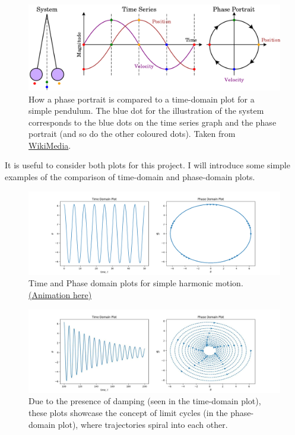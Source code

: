 \documentclass[10pt, twocolumn]{article}
\begin{document}
\begin{figure}[H]
    \centering  
    \includegraphics[width = \columnwidth]{Projects/ForcedSimplePendulum/WrittenReport/figs/Pendulum_phase_portrait_illustration.svg.png}
    \caption{How a phase portrait is compared to a time-domain plot for a simple pendulum. The blue dot for the illustration of the system corresponds to the blue dots on the time series graph and the phase portrait (and so do the other coloured dots). Taken from \href{https://commons.wikimedia.org/wiki/File:Pendulum_phase_portrait_illustration.svg}{WikiMedia}.}
    \label{fig:enter-label}
\end{figure}
 It is useful to consider both plots for this project. I will introduce some simple examples of the comparison of time-domain and phase-domain plots.
 \begin{figure}[H]
     \centering
     \includegraphics[width = \columnwidth]{Projects/ForcedSimplePendulum/Plots/demo_shm.png}
     \caption{Time and Phase domain plots for simple harmonic motion. \href{https://github.com/linsuong/PHYS-6017-Labs/blob/main/Projects/ForcedSimplePendulum/Plots/demo_shm.gif}{(Animation here)}}
     \label{fig:enter-label}
 \end{figure}

 \begin{figure}[H]
     \centering
     \includegraphics[width = \columnwidth]{Projects/ForcedSimplePendulum/Plots/demo_limit_cycles.jpg}
     \caption{Due to the presence of damping (seen in the time-domain plot), these plots showcase the concept of limit cycles (in the phase-domain plot), where trajectories spiral into each other.}
     \label{fig:enter-label}
 \end{figure}
\end{document}
